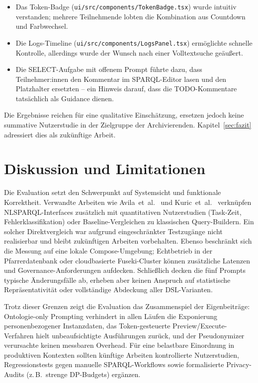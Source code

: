 \begin{itemize}
  \item Das Token-Badge (\texttt{ui/src/components/TokenBadge.tsx}) wurde intuitiv verstanden; mehrere Teilnehmende lobten die Kombination aus Countdown und Farbwechsel.
  \item Die Logs-Timeline (\texttt{ui/src/components/LogsPanel.tsx}) ermöglichte schnelle Kontrolle, allerdings wurde der Wunsch nach einer Volltextsuche geäußert.
  \item Die SELECT-Aufgabe mit offenem Prompt führte dazu, dass Teilnehmer:innen den Kommentar im SPARQL-Editor lasen und den Platzhalter ersetzten – ein Hinweis darauf, dass die TODO-Kommentare tatsächlich als Guidance dienen.
\end{itemize}

Die Ergebnisse reichen für eine qualitative Einschätzung, ersetzen jedoch keine summative Nutzerstudie in der Zielgruppe der Archivierenden. Kapitel~\ref{sec:fazit} adressiert dies als zukünftige Arbeit.

\section{Diskussion und Limitationen}

Die Evaluation setzt den Schwerpunkt auf Systemsicht und funktionale Korrektheit. Verwandte Arbeiten wie Avila~et~al.\ \cite{avila-kgqa-llm} und Kuric~et~al.\ \cite{kuric-usability} verknüpfen NL{\textrightarrow}SPARQL-Interfaces zusätzlich mit quantitativen Nutzerstudien (Task-Zeit, Fehlerklassifikation) oder Baseline-Vergleichen zu klassischen Query-Buildern. Ein solcher Direktvergleich war aufgrund eingeschränkter Testzugänge nicht realisierbar und bleibt zukünftigen Arbeiten vorbehalten. Ebenso beschränkt sich die Messung auf eine lokale Compose-Umgebung; Echtbetrieb in der Pfarrerdatenbank oder cloudbasierte Fuseki-Cluster können zusätzliche Latenzen und Governance-Anforderungen aufdecken. Schließlich decken die fünf Prompts typische Änderungsfälle ab, erheben aber keinen Anspruch auf statistische Repräsentativität oder vollständige Abdeckung aller DSL-Varianten.

Trotz dieser Grenzen zeigt die Evaluation das Zusammenspiel der Eigenbeiträge: Ontologie-only Prompting verhindert in allen Läufen die Exponierung personenbezogener Instanzdaten, das Token-gesteuerte Preview/Execute-Verfahren hielt unbeaufsichtigte Ausführungen zurück, und der Pseudonymizer verursachte keinen messbaren Overhead. Für eine belastbare Einordnung in produktiven Kontexten sollten künftige Arbeiten kontrollierte Nutzerstudien, Regressionstests gegen manuelle SPARQL-Workflows sowie formalisierte Privacy-Audits (z.\,B.\ strenge DP-Budgets) ergänzen.

